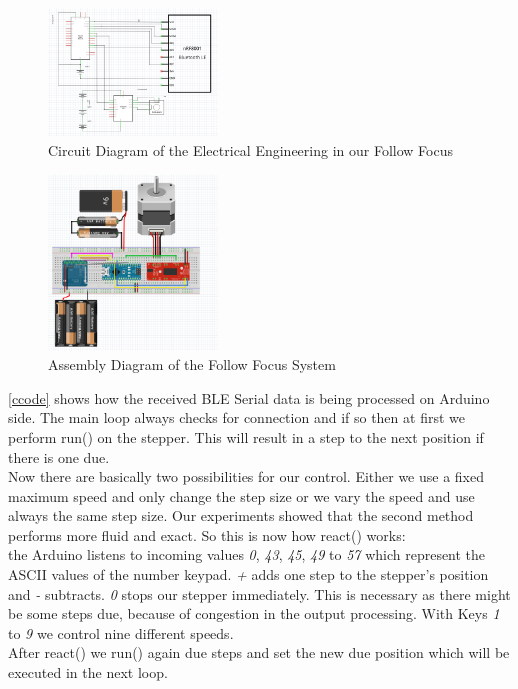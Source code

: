 \documentclass{sigchi}
\begin{document}
\begin{figure}
\includegraphics[width=0.4\textwidth]{circuit.png}
\caption{Circuit Diagram of the Electrical Engineering in our Follow Focus}
\label{fig:Circuit}
\end{figure}
\begin{figure}
\includegraphics[width=0.4\textwidth]{assembly.png}
\caption{Assembly Diagram of the Follow Focus System}
\label{fig:Assembly}
\end{figure}
	
\autoref{ccode} shows how the received BLE Serial data is being processed on Arduino side. The main loop always checks for connection and if so then at first we perform run() on the stepper. This will result in a step to the next position if there is one due. \\
Now there are basically two possibilities for our control. Either we use a fixed maximum speed and only change the step size or we vary the speed and use always the same step size. Our experiments showed that the second method performs more fluid and exact. So this is now how react() works: \\
the Arduino listens to incoming values \textit{0}, \textit{43}, \textit{45}, \textit{49} to \textit{57} which represent the ASCII values of the number keypad. \textit{+} adds one step to the stepper's position and \textit{-} subtracts. \textit{0} stops our stepper immediately. This is necessary as there might be some steps due, because of congestion in the output processing. With Keys \textit{1} to \textit{9} we control nine different speeds.\\
 After react() we run() again due steps and set the new due position which will be executed in the next loop.

 
\end{document}
